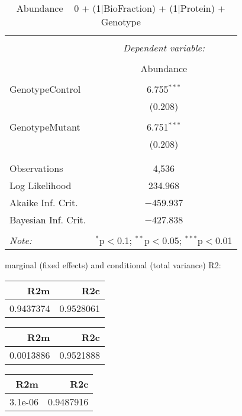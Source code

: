 \documentclass[11pt]{report}
\begin{document}
\begin{table}[!htbp] \centering 
  \caption{Abundance ~ 0 + (1|BioFraction) + (1|Protein) + Genotype} 
  \label{} 
\begin{tabular}{@{\extracolsep{5pt}}lc} 
\\[-1.8ex]\hline 
\hline \\[-1.8ex] 
 & \multicolumn{1}{c}{\textit{Dependent variable:}} \\ 
\cline{2-2} 
\\[-1.8ex] & Abundance \\ 
\hline \\[-1.8ex] 
 GenotypeControl & 6.755$^{***}$ \\ 
  & (0.208) \\ 
  & \\ 
 GenotypeMutant & 6.751$^{***}$ \\ 
  & (0.208) \\ 
  & \\ 
\hline \\[-1.8ex] 
Observations & 4,536 \\ 
Log Likelihood & 234.968 \\ 
Akaike Inf. Crit. & $-$459.937 \\ 
Bayesian Inf. Crit. & $-$427.838 \\ 
\hline 
\hline \\[-1.8ex] 
\textit{Note:}  & \multicolumn{1}{r}{$^{*}$p$<$0.1; $^{**}$p$<$0.05; $^{***}$p$<$0.01} \\ 
\end{tabular} 
\end{table} 
marginal (fixed effects) and conditional (total variance) R2:

\begin{tabular}{r|r}
\hline
R2m & R2c\\
\hline
0.9437374 & 0.9528061\\
\hline
\end{tabular}

\begin{tabular}{r|r}
\hline
R2m & R2c\\
\hline
0.0013886 & 0.9521888\\
\hline
\end{tabular}

\begin{tabular}{r|r}
\hline
R2m & R2c\\
\hline
3.1e-06 & 0.9487916\\
\hline
\end{tabular}
\end{document}
